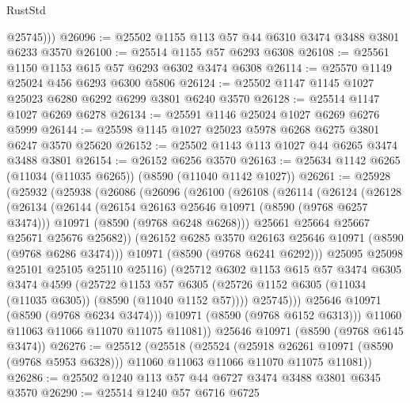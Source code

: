 \begin{lexlean}{RustStd}
\begin{coremodule}
          @25745)))
@26096 := @25502 @1155 @113 @57 @44 @6310 @3474 @3488 @3801 @6233 @3570
@26100 := @25514 @1155 @57 @6293 @6308
@26108 := @25561 @1150 @1153 @615 @57 @6293 @6302 @3474 @6308
@26114 := @25570 @1149 @25024 @456 @6293 @6300 @5806
@26124 := @25502 @1147 @1145 @1027 @25023 @6280 @6292 @6299 @3801 @6240 @3570
@26128 := @25514 @1147 @1027 @6269 @6278
@26134 := @25591 @1146 @25024 @1027 @6269 @6276 @5999
@26144 := @25598 @1145 @1027 @25023 @5978 @6268 @6275 @3801 @6247 @3570 @25620
@26152 := @25502 @1143 @113 @1027 @44 @6265 @3474 @3488 @3801
@26154 := @26152 @6256 @3570
@26163 := @25634 @1142 @6265 (@11034 (@11035 @6265)) (@8590 (@11040 @1142 @1027))
@26261 := @25928
    (@25932
      (@25938
        (@26086
          (@26096
            (@26100
              (@26108
                (@26114
                  (@26124
                    (@26128
                      (@26134
                        (@26144
                          (@26154 @26163 @25646 @10971 (@8590 (@9768 @6257 @3474)))
                          @10971
                          (@8590 (@9768 @6248 @6268)))
                        @25661
                        @25664
                        @25667
                        @25671
                        @25676
                        @25682))
                    (@26152 @6285 @3570 @26163 @25646 @10971 (@8590 (@9768 @6286 @3474)))
                    @10971
                    (@8590 (@9768 @6241 @6292)))
                  @25095
                  @25098
                  @25101
                  @25105
                  @25110
                  @25116)
                (@25712
                  @6302
                  @1153
                  @615
                  @57
                  @3474
                  @6305
                  @3474
                  @4599
                  (@25722
                    @1153
                    @57
                    @6305
                    (@25726 @1152 @6305 (@11034 (@11035 @6305)) (@8590 (@11040 @1152 @57))))
                  @25745)))
            @25646
            @10971
            (@8590 (@9768 @6234 @3474)))
          @10971
          (@8590 (@9768 @6152 @6313)))
        @11060
        @11063
        @11066
        @11070
        @11075
        @11081))
    @25646
    @10971
    (@8590 (@9768 @6145 @3474))
@26276 := @25512
    (@25518
      (@25524
        (@25918 @26261 @10971 (@8590 (@9768 @5953 @6328)))
        @11060
        @11063
        @11066
        @11070
        @11075
        @11081))
@26286 := @25502 @1240 @113 @57 @44 @6727 @3474 @3488 @3801 @6345 @3570
@26290 := @25514 @1240 @57 @6716 @6725

\end{coremodule}
\end{lexlean}
